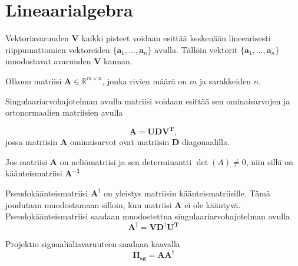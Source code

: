 \section{Lineaarialgebra}
Vektoriavaruuden $\mathbf{V}$ kaikki pisteet voidaan esittää keskenään lineearisesti riippumattomien vektoreiden $\{\mathbf{a}_1,...,\mathbf{a}_n\}$ avulla. Tällöin vektorit $\{\mathbf{a}_1,...,\mathbf{a}_n\}$ muodostavat avaruuden $\mathbf{V}$ kannan.


Olkoon matriisi $\mathbf{A}\in \mathbb{R}^{m\times n}$, jonka rivien määrä on $\mathit{m}$ ja sarakkeiden $\mathit{n}$. 


Singulaariarvohajotelman avulla matriisi voidaan esittää sen ominaisarvojen ja ortonormaalien matriisien avulla

\begin{equation}
    \mathbf{A = UDV^T,}
\end{equation}
jossa matriisin $\mathbf{A}$ ominaisarvot ovat matriisin $\mathbf{D}$ diagonaalilla. 

Jos matriisi $\mathbf{A}$ on neliömatriisi ja sen determinantti $\det(A)\ne 0$, niin sillä on käänteismatriisi $\mathbf{A^{-1}}$

Pseudokäänteismatriisi $\mathbf{A^{\dagger}}$ on yleistys matriisin käänteismatriisille. Tämä joudutaan muodostamaan silloin, kun matriisi $\mathbf{A}$ ei ole kääntyvä. Pseudokäänteismatriisi saadaan muodostettua singulaariarvohajotelman avulla
\begin{equation}
    \mathbf{A^{\dagger} = VD^{\dagger}U^T}
\end{equation}

Projektio signaalialiavaruuteen saadaan kaavalla
\begin{equation}
    \mathbf{\Pi_{sg} = AA^{\dagger}}
\end{equation}

